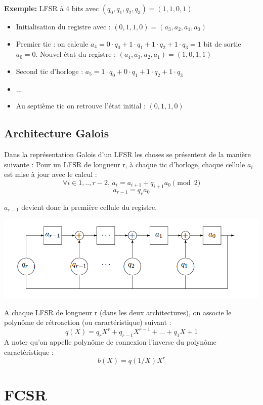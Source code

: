 \documentclass[11pt]{report}
\begin{document}
	\textbf{Exemple:} LFSR à 4 bits avec $(q_0,q_1,q_2,q_3)=(1,1,0,1)$ 
	\begin{itemize}
	\item Initialisation du registre avec : $(0,1,1,0)=(a_3,a_2,a_1,a_0)$
	\item Premier tic : on calcule $a_4=0 \cdot q_0+1 \cdot q_1+1 \cdot q_2+1 \cdot q_3 = 1$ bit de sortie $a_0 = 0$. Nouvel état du registre : $(a_4,a_3,a_2,a_1)=(1,0,1,1)$
	\item Second tic d'horloge : $a_5=1 \cdot q_0+0 \cdot q_1+1 \cdot q_2+1 \cdot q_3$
	\item ...
	\item Au septième tic on retrouve l'état initial : $(0,1,1,0)$
	\end{itemize}
	
	
	
	
	\subsection{Architecture Galois}
	
	Dans la représentation Galois d'un LFSR les choses se présentent de la manière suivante : 
	Pour un LFSR de longueur r, à chaque tic d'horloge, chaque cellule $a_i$ est mise à jour avec le calcul : 
	\[
	\forall i \in {1,..,r-2}, 
	\,a_i = a_{i+1} + q_{i+1}a_0 \pmod{2}\]
	\[ a_{r-1} = q_ra_0
	\]
	
	$a_{r-1}$ devient donc la première cellule du registre. 
	\\
	\begin{center}
	\includegraphics{GaloisLFSR.png}
	\label{LFSRGalois}
	\end{center}
	
	A chaque LFSR de longueur r (dans les deux architectures), on associe le polynôme de rétroaction (ou caractéristique) suivant : 
	\[
		q(X) = q_rX^r + q_{r-1}X^{r-1} + ... + q_1X + 1
	\]	
	A noter qu'on appelle polynôme de connexion l'inverse du polynôme caractéristique : 
	\[
		b(X) = q(1/X)X^r
	\]
	
	
\section{FCSR}
\end{document}
